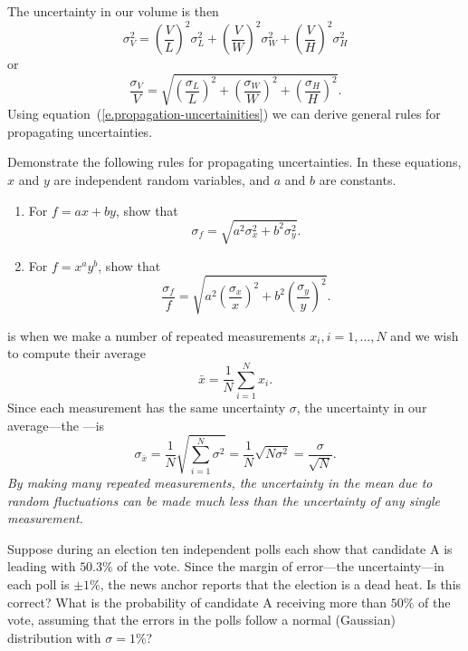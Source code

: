 The uncertainty in our volume is then
\begin{equation}\label{e.uncertainty-volume}
	\sigma_{V}^{2} = \left(\frac{V}{L}\right)^{2}\sigma_{L}^{2}
		+ \left(\frac{V}{W}\right)^{2}\sigma_{W}^{2}
		+ \left(\frac{V}{H}\right)^{2}\sigma_{H}^{2}
\end{equation}
or
\[ \frac{\sigma_{V}}{V} = 
	\sqrt{\left(\frac{\sigma_{L}}{L}\right)^{2}
	+ \left(\frac{\sigma_{W}}{W}\right)^{2}
	+ \left(\frac{\sigma_{H}}{H}\right)^{2} }.
\]
Using equation~(\ref{e.propagation-uncertainities}) we can derive general rules for propagating uncertainties.

\begin{exercisebox}
Demonstrate the following rules for propagating uncertainties. In these equations, $x$ and $y$ are independent random variables, and $a$ and $b$ are constants.
\begin{enumerate}
\item For $f = ax + by$, show that 
\[ \sigma_{f} = \sqrt{ a^{2}\sigma_{x}^{2} + b^{2}\sigma_{y}^{2}}. \]
\item For $f = x^{a}y^{b}$, show that
\[ 
	\frac{\sigma_{f}}{f} = \sqrt{ a^{2}\left(\frac{\sigma_{x}}{x}\right)^{2} 
		+ b^{2}\left(\frac{\sigma_{y}}{y}\right)^{2} }.
\]
\end{enumerate}
\end{exercisebox}

 is when we make a number of repeated measurements $x_{i}, i=1,\ldots,N$ and we wish to compute their average
\[ \bar{x} = \frac{1}{N}\sum_{i=1}^{N}x_{i} . \]
Since each measurement has the same uncertainty $\sigma$, the uncertainty in our average---the ---is
\begin{equation}\label{e.error-mean}
 \sigma_{\bar{x}} = \frac{1}{N}\sqrt{\sum_{i=1}^{N}\sigma^{2}}
 	= \frac{1}{N}\sqrt{N\sigma^{2}}
  = \frac{\sigma}{\sqrt{N}}.
\end{equation}
\emph{By making many repeated measurements, the uncertainty in the mean due to random fluctuations can be made much less than the uncertainty of any single measurement.}

\begin{exercisebox}
Suppose during an election ten independent polls each show that candidate A is leading with $50.3\%$ of the vote. Since the margin of error---the uncertainty---in each poll is $\pm 1\%$, the news anchor reports that the election is a dead heat.  Is this correct?  What is the probability of candidate A receiving more than $50\%$ of the vote, assuming that the errors in the polls follow a normal (Gaussian) distribution with $\sigma = 1\%$?
\end{exercisebox}

